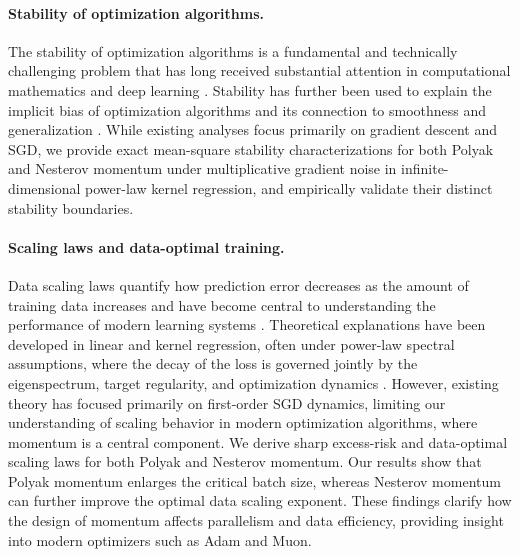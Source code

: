 \documentclass[11pt]{article}
\begin{document}
\paragraph{Stability of optimization algorithms.}
The stability of optimization algorithms is a fundamental and technically challenging problem that has long received substantial attention in computational mathematics and deep learning \citep{zhu2019anisotropic,wu2018sgd,nar2018step,ma2021linear,wu2022alignment,wu2023implicit,chemnitz2025characterizing}. Stability has further been used to explain the implicit bias of optimization algorithms and its connection to smoothness and generalization \citep{mulayoff2021implicit,nacson2023implicit,qiao2024stable,wu2023implicit,kaur2023maximum}. While existing analyses focus primarily on gradient descent and SGD, we provide exact mean-square stability characterizations for both Polyak and Nesterov momentum under multiplicative gradient noise in infinite-dimensional power-law kernel regression, and empirically validate their distinct stability boundaries.

\paragraph{Scaling laws and data-optimal training.}
Data scaling laws quantify how prediction error decreases as the amount of training data increases and have become central to understanding the performance of modern learning systems \citep{hestness2017deep,kaplan2020scaling,hoffmann2022training,grattafiori2024llama,deepseekai2026deepseekv4}. Theoretical explanations have been developed in linear and kernel regression, often under power-law spectral assumptions, where the decay of the loss is governed jointly by the eigenspectrum, target regularity, and optimization dynamics \citep{sharma2022scaling,hutter2021learning,maloney2022solvable,wei2022more,jain2024scaling,michaud2023quantization,nam2024exactly,atanasov2026scaling,bahri2024explaining,dohmatob2024tale,bordelon2024dynamical,lin2024scaling,paquette2024phases,bordelon2025feature,yan2026larger,lin2025improved,sous2026asymmetric,wang2026power,li2026functional,zhang2025critical,wang2026fast,li2026optimal, ding2025scalinglawstochasticgradient}. However, existing theory has focused primarily on first-order SGD dynamics, limiting our understanding of scaling behavior in modern optimization algorithms, where momentum is a central component. We derive sharp excess-risk and data-optimal scaling laws for both Polyak and Nesterov momentum. Our results show that Polyak momentum enlarges the critical batch size, whereas Nesterov momentum can further improve the optimal data scaling exponent. These findings clarify how the design of momentum affects parallelism and data efficiency, providing insight into modern optimizers such as Adam and Muon.
\end{document}
